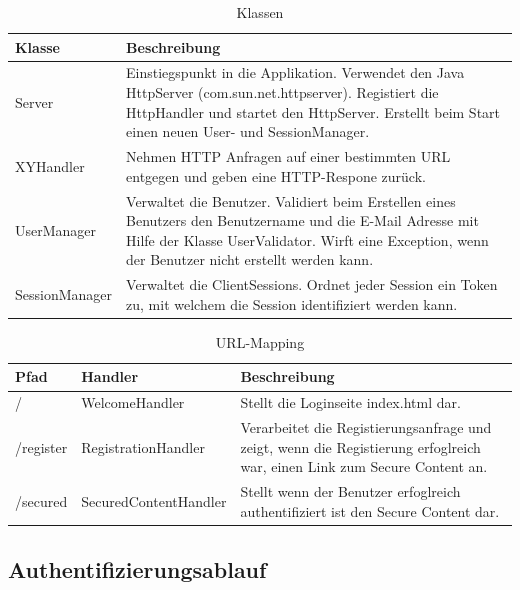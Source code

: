 \begin{table}[H]
\begin{center}
\begin{tabular}{l p{10.5cm} }
\hline
\textbf{Klasse} & \textbf{Beschreibung} \\ \hline \hline
Server      & Einstiegspunkt in die Applikation. Verwendet den Java HttpServer (com.sun.net.httpserver). Registiert die HttpHandler und startet den HttpServer. 
              Erstellt beim Start einen neuen User- und SessionManager. \\
XYHandler   & Nehmen HTTP Anfragen auf einer bestimmten URL entgegen und geben eine HTTP-Respone zurück. \\
UserManager & Verwaltet die Benutzer. Validiert beim Erstellen eines Benutzers den Benutzername und die E-Mail Adresse mit Hilfe der Klasse UserValidator.
              Wirft eine Exception, wenn der Benutzer nicht erstellt werden kann. \\
SessionManager & Verwaltet die ClientSessions. Ordnet jeder Session ein Token zu, mit welchem die Session identifiziert werden kann. \\
\hline \hline
\end{tabular}
\caption{Klassen}
\label{tab:class}
\end{center}
\end{table}

\begin{table}[H]
\begin{center}
\begin{tabular}{l l p{7cm} }
\hline
\textbf{Pfad} & \textbf{Handler}    & \textbf{Beschreibung} \\ \hline \hline
/             & WelcomeHandler          & Stellt die Loginseite index.html dar.\\
/register     & RegistrationHandler     & Verarbeitet die Registierungsanfrage und zeigt, wenn die Registierung erfoglreich war, einen Link zum Secure Content an. \\
/secured      & SecuredContentHandler   & Stellt wenn der Benutzer erfoglreich authentifiziert ist den Secure Content dar.\\
\hline \hline
\end{tabular}
\caption{URL-Mapping}
\label{tab:url-mapping}
\end{center}
\end{table}

\subsection{Authentifizierungsablauf}

